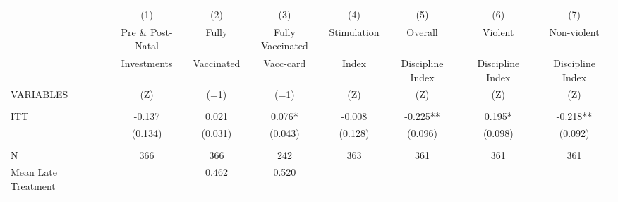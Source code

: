 \begin{tabular}{lccccccc} \hline
 & (1) & (2) & (3) & (4) & (5) & (6) & (7) \\
 & Pre \& Post-Natal & Fully & Fully Vaccinated & Stimulation & Overall & Violent & Non-violent \\
 & Investments & Vaccinated & Vacc-card & Index & Discipline Index & Discipline Index & Discipline Index \\
VARIABLES & (Z) & (=1) & (=1) & (Z) & (Z) & (Z) & (Z) \\ \hline
 &  &  &  &  &  &  &  \\
ITT & -0.137 & 0.021 & 0.076* & -0.008 & -0.225** & 0.195* & -0.218** \\
 & (0.134) & (0.031) & (0.043) & (0.128) & (0.096) & (0.098) & (0.092) \\
 &  &  &  &  &  &  &  \\
N & 366 & 366 & 242 & 363 & 361 & 361 & 361 \\
 Mean Late Treatment &  & 0.462 & 0.520 &  &  &  &  \\ \hline
\end{tabular}
